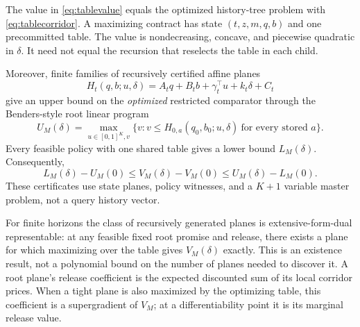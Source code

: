 \begin{theorem}\label{thm:bridge}
The value in \eqref{eq:tablevalue} equals the optimized history-tree problem with \eqref{eq:tablecorridor}. A maximizing contract has state $(t,z,m,q,b)$ and one precommitted table. The value is nondecreasing, concave, and piecewise quadratic in $\delta$. It need not equal the recursion that reselects the table in each child.

Moreover, finite families of recursively certified affine planes
\[
 H_t(q,b;u,\delta)=A_tq+B_tb+\gamma_t^\top u+k_t\delta+C_t
\]
give an upper bound on the \emph{optimized} restricted comparator through the Benders-style root linear program
\begin{equation}\label{eq:rootLP}
 U_M(\delta)=\max_{u\in[0,1]^K,v}\{v:v\leq H_{0,a}(q_0,b_0;u,\delta)\ \text{for every stored }a\}.
\end{equation}
Every feasible policy with one shared table gives a lower bound $L_M(\delta)$. Consequently,
\begin{equation}\label{eq:stategain}
 L_M(\delta)-U_M(0)\leq V_M(\delta)-V_M(0)
 \leq U_M(\delta)-L_M(0).
\end{equation}
These certificates use state planes, policy witnesses, and a $K+1$ variable master problem, not a query history vector.

For finite horizons the class of recursively generated planes is extensive-form-dual representable: at any feasible fixed root promise and release, there exists a plane for which maximizing over the table gives $V_M(\delta)$ exactly. This is an existence result, not a polynomial bound on the number of planes needed to discover it. A root plane's release coefficient is the expected discounted sum of its local corridor prices. When a tight plane is also maximized by the optimizing table, this coefficient is a supergradient of $V_M$; at a differentiability point it is its marginal release value.
\end{theorem}

